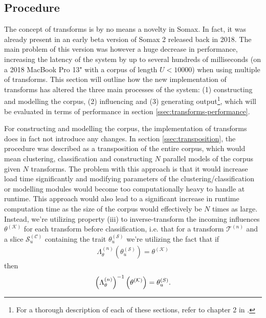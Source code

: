 \subsection{Procedure}
The concept of transforms is by no means a novelty in Somax. In fact, it was already present in an early beta version of Somax 2 released back in 2018. The main problem of this version was however a huge decrease in performance, increasing the latency of the system by up to several hundreds of milliseconds (on a 2018 MacBook Pro 13" with a corpus of length $U < 10000$) when using multiple of transforms. This section will outline how the new implementation of transforms has altered the three main processes of the system: (1) constructing and modelling the corpus, (2) influencing and (3) generating output\footnote{For a thorough description of each of these sections, refer to chapter 2 in \cite{borg2020dynamic}.}, which will be evaluated in terms of performance in section \ref{ssec:transforms-performance}.

For constructing and modelling the corpus, the implementation of transforms does in fact not introduce any changes. In section \ref{ssec:transposition}, the procedure was described as a transposition of the entire corpus, which would mean clustering, classification and constructing $N$ parallel models of the corpus given $N$ transforms. The problem with this approach is that it would increase load time significantly and modifying parameters of the clustering/classification or modelling modules would become too computationally heavy to handle at runtime. This approach would also lead to a significant increase in runtime computation time as the size of the corpus would effectively be $N$ times as large. Instead, we're utilizing property (iii) to inverse-transform the incoming influences $\theta^{(\mathcal K)}$ for each transform before classification, i.e. that for a transform $\mathcal T^{(n)}$ and a slice $\mathcal S^{(\mathcal C)}_u$ containing the trait $\theta^{(\mathcal S)}_u$ we're utilizing the fact that if \begin{align}
		\Lambda^{(n)}_\theta\left(\theta^{(\mathcal S)}_u\right) = \theta^{(\mathcal K)}
	\end{align} 
	then	
	\begin{align}
		\left(\Lambda^{(n)}_\theta\right)^{-1}\left(\theta^{(\mathcal K)}\right) = \theta^{(\mathcal \mathcal S)}_u.
	\end{align}

